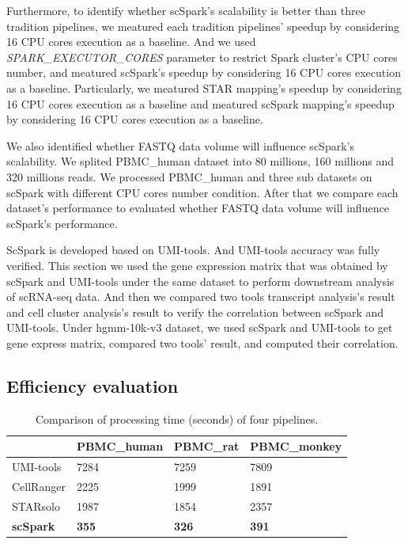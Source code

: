 \documentclass[conference]{IEEEtran}
\begin{document}
Furthermore, to identify whether scSpark's scalability is better than three tradition pipelines, 
we meatured each tradition pipelines' speedup by considering 16 CPU cores execution as a baseline.
And we used \textit{SPARK\_EXECUTOR\_CORES} parameter to restrict Spark cluster's CPU cores number, and meatured scSpark's speedup by considering 16 CPU cores execution as a baseline.
Particularly, we meatured STAR mapping's speedup by considering 16 CPU cores execution as a baseline and meatured scSpark mapping's speedup by considering 16 CPU cores execution as a baseline.

We also identified whether FASTQ data volume will influence scSpark's scalability.
We splited PBMC\_human dataset into 80 millions, 160 millions and 320 millions reads.
We processed PBMC\_human and three sub datasets on scSpark with different CPU cores number condition.
After that we compare each dataset's performance to evaluated whether FASTQ data volume will influence scSpark's performance.

ScSpark is developed based on UMI-tools. 
And UMI-tools accuracy was fully verified. 
This section we used the gene expression matrix that was obtained by scSpark and UMI-tools under the same dataset to perform downstream analysis of scRNA-seq data. 
And then we compared two tools transcript analysis's result and cell cluster analysis's result to verify the correlation between scSpark and UMI-tools. 
Under hgmm-10k-v3 dataset, we used scSpark and UMI-tools to get gene express matrix, compared two tools' result, and computed their correlation.


\subsection{Efficiency evaluation}

\begin{table}
	\centering
	\caption{Comparison of processing time (seconds) of four pipelines.}\label{tab1}
	\begin{tabular}{l | l | l | l }
		\hline
		 & PBMC\_human & PBMC\_rat & PBMC\_monkey \\ 
		\hline
		UMI-tools & 7284 & 7259 & 7809 \\
		CellRanger & 2225 & 1999 & 1891 \\
		STARsolo & 1987 & 1854 & 2357 \\
		\textbf{scSpark} & \textbf{355} & \textbf{326} & \textbf{391} \\
		\hline
	\end{tabular}
\end{table}
\end{document}
